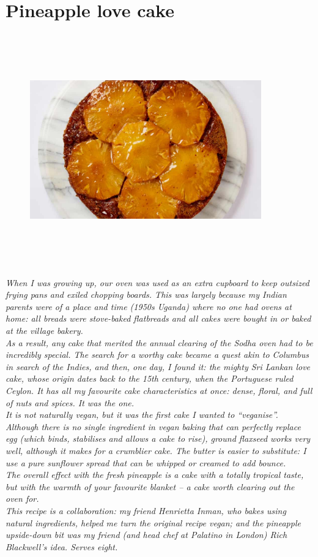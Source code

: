 \documentclass{book}
\begin{document}
\section{Pineapple love cake}
\begin{figure}
\centering\includegraphics[width=10cm,height=10cm,keepaspectratio]{Recipe_Pictures/Pineapple_love_cake.png}
\end{figure}
\emph{When I was growing up, our oven was used as an extra cupboard to keep outsized frying pans and exiled chopping boards. This was largely because my Indian parents were of a place and time (1950s Uganda) where no one had ovens at home: all breads were stove-baked flatbreads and all cakes were bought in or baked at the village bakery.\\ 
As a result, any cake that merited the annual clearing of the Sodha oven had to be incredibly special. The search for a worthy cake became a quest akin to Columbus in search of the Indies, and then, one day, I found it: the mighty Sri Lankan love cake, whose origin dates back to the 15th century, when the Portuguese ruled Ceylon. It has all my favourite cake characteristics at once: dense, floral, and full of nuts and spices. It was the one.\\ 
It is not naturally vegan, but it was the first cake I wanted to “veganise”. Although there is no single ingredient in vegan baking that can perfectly replace egg (which binds, stabilises and allows a cake to rise), ground flaxseed works very well, although it makes for a crumblier cake. The butter is easier to substitute: I use a pure sunflower spread that can be whipped or creamed to add bounce.\\ 
The overall effect with the fresh pineapple is a cake with a totally tropical taste, but with the warmth of your favourite blanket – a cake worth clearing out the oven for.\\ 
This recipe is a collaboration: my friend Henrietta Inman, who bakes using natural ingredients, helped me turn the original recipe vegan; and the pineapple upside-down bit was my friend (and head chef at Palatino in London) Rich Blackwell’s idea. Serves eight.}\\\\ 
\end{document}
